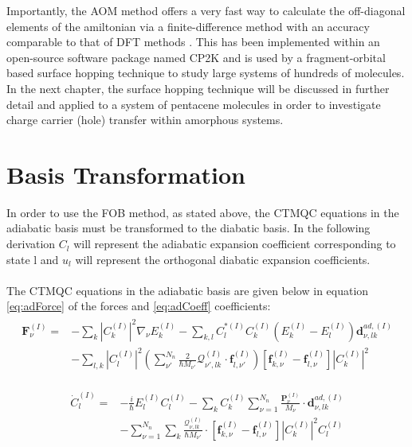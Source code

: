 Importantly, the AOM method offers a very fast way to calculate the off-diagonal elements of the amiltonian via a finite-difference method with an accuracy comparable to that of DFT methods \cite{AOM_vs_HigherOrder}. This has been implemented within an open-source software package named CP2K and is used by a fragment-orbital based surface hopping technique to study large systems of hundreds of molecules. In the next chapter, the surface hopping technique will be discussed in further detail and applied to a system of pentacene molecules in order to investigate charge carrier (hole) transfer within amorphous systems.


\section{Basis Transformation}
In order to use the FOB method, as stated above, the CTMQC equations in the adiabatic basis must be transformed to the diabatic basis. In the following derivation $C_{l}$ will represent the adiabatic expansion coefficient corresponding to state l and $u_{l}$ will represent the orthogonal diabatic expansion coefficients.
\\\\
The CTMQC equations in the adiabatic basis are given below in equation \eqref{eq:adForce} of the forces and \eqref{eq:adCoeff} coefficients:
\begin{align}
  \begin{split}
	  \mathbf{F}_{\nu}^{(I)} = &- \sum_{k} |C_{k}^{(I)}|^2 \nabla_{\nu}E_{k}^{(I)} - \sum_{k, l} C_{l}^{* (I)} C_{k}^{(I)} \left(E_{k}^{(I)} - E_{l}^{(I)} \right) \mathbf{d}_{\nu, lk}^{ad, (I)} \\
	  &- \sum_{l,k} |C_{l}^{(I)}|^2 \left( \sum_{\nu'}^{N_{n}} \frac{2}{\hbar M_{\nu'}} \mathcal{Q}_{\nu', lk}^{(I)} \cdot \mathbf{f}_{l, \nu'}^{(I)} \right)\left[ \mathbf{f}_{k, \nu}^{(I)} - \mathbf{f}_{l, \nu}^{(I)} \right] |C_{k}^{(I)}|^2 
  \end{split}
  \label{eq:adForce}
\end{align}

\begin{align}
  \begin{split}
	\dot{C}_{l}^{(I)} = &-\frac{i}{\hbar} E_{l}^{(I)} C_{l}^{(I)} - \sum_{k} C_{k}^{(I)} \sum_{\nu=1}^{N_{n}} \frac{\mathbf{P}_{\nu}^{(I)}}{M_{\nu}} \cdot \mathbf{d}_{\nu, lk}^{ad, (I)} \\
	&- \sum_{\nu=1}^{N_{n}} \sum_{k} \frac{\mathcal{Q}_{\nu, lk}^{(I)}}{\hbar M_{\nu'}} \cdot \left[\mathbf{f}_{k, \nu}^{(I)} - \mathbf{f}_{l, \nu}^{(I)} \right] |C_{k}^{(I)}|^2 C_{l}^{(I)}
  \end{split}
  \label{eq:adCoeff}
\end{align}

